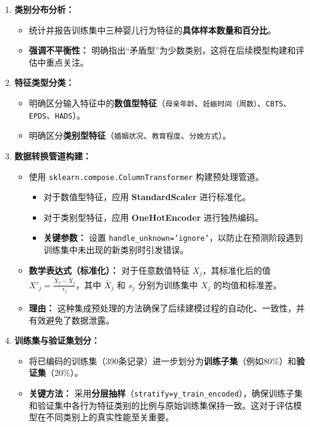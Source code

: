 \documentclass[withoutpreface,bwprint]{cumcmthesis}
\begin{document}
\begin{enumerate}
        \item \textbf{类别分布分析：}
        \begin{itemize}
            \item 统计并报告训练集中三种婴儿行为特征的\textbf{具体样本数量和百分比}。
            \item \textbf{强调不平衡性：} 明确指出“矛盾型”为少数类别，这将在后续模型构建和评估中重点关注。
        \end{itemize}
        \item \textbf{特征类型分类：}
        \begin{itemize}
            \item 明确区分输入特征中的\textbf{数值型特征}（\texttt{母亲年龄}、\texttt{妊娠时间（周数）}、\texttt{CBTS}、\texttt{EPDS}、\texttt{HADS}）。
            \item 明确区分\textbf{类别型特征}（\texttt{婚姻状况}、\texttt{教育程度}、\texttt{分娩方式}）。
        \end{itemize}
        \item \textbf{数据转换管道构建：}
        \begin{itemize}
            \item 使用 \texttt{sklearn.compose.ColumnTransformer} 构建预处理管道。
            \begin{itemize}
                \item 对于数值型特征，应用 \textbf{StandardScaler} 进行标准化。
                \item 对于类别型特征，应用 \textbf{OneHotEncoder} 进行独热编码。
                \item \textbf{关键参数：} 设置 \texttt{handle\_unknown='ignore'}，以防止在预测阶段遇到训练集中未出现的新类别时引发错误。
            \end{itemize}
            \item \textbf{数学表达式（标准化）：} 对于任意数值特征 $X_j$，其标准化后的值 $X'_j = \frac{X_j - \bar{X}_j}{s_j}$，其中 $\bar{X}_j$ 和 $s_j$ 分别为训练集中 $X_j$ 的均值和标准差。
            \item \textbf{理由：} 这种集成预处理的方法确保了后续建模过程的自动化、一致性，并有效避免了数据泄露。
        \end{itemize}
        \item \textbf{训练集与验证集划分：}
        \begin{itemize}
            \item 将已编码的训练集（390条记录）进一步划分为\textbf{训练子集}（例如80\%）和\textbf{验证集}（20\%）。
            \item \textbf{关键方法：} 采用\textbf{分层抽样}（\texttt{stratify=y\_train\_encoded}），确保训练子集和验证集中各行为特征类别的比例与原始训练集保持一致。这对于评估模型在不同类别上的真实性能至关重要。
        \end{itemize}
    \end{enumerate}
\end{document}
